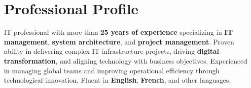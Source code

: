 \section{Professional Profile}
IT professional with more than \textbf{25 years of experience} specializing in \textbf{IT management}, \textbf{system architecture}, and \textbf{project management}. Proven ability in delivering complex IT infrastructure projects, driving \textbf{digital transformation}, and aligning technology with business objectives. Experienced in managing global teams and improving operational efficiency through technological innovation. Fluent in \textbf{English}, \textbf{French}, and other languages.

